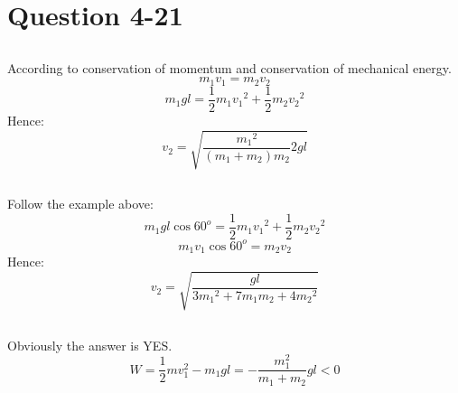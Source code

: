 \documentclass[12pt,a4paper]{article}%
\begin{document}
	\section{Question 4-21}
	\subsection{}
	\noindent According to conservation of momentum and conservation of mechanical energy.
	\begin{equation}
		m_1v_1=m_2v_2
	\end{equation}
	\begin{equation}
		m_1gl=\frac{1}{2}m_1{v_1}^2+\frac{1}{2}m_2{v_2}^2
	\end{equation}
	Hence:
	\begin{equation*}
		v_2=\sqrt{\frac{{m_1}^2}{\left( m_1+m_2 \right) m_2}2gl}
	\end{equation*}
	\subsection{}
	\noindent Follow the example above:
	\begin{equation}
		m_1gl\cos 60^o=\frac{1}{2}m_1{v_1}^2+\frac{1}{2}m_2{v_2}^2
	\end{equation}
	\begin{equation}
		m_1v_1\cos 60^o=m_2v_2
	\end{equation}
	Hence:
	\begin{equation*}
		v_2=\sqrt{\frac{gl}{3{m_1}^2+7m_1m_2+4{m_2}^2}}
	\end{equation*}
	\subsection{}
	\noindent Obviously the answer is YES.
	\begin{equation*}
		W=\frac{1}{2}mv_1^2-m_1gl=-\frac{m_1^2}{m_1+m_2}gl<0
	\end{equation*}
\end{document}
